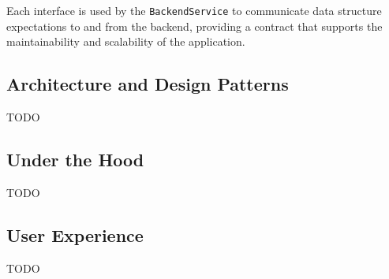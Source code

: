 Each interface is used by the \texttt{BackendService} to communicate data structure expectations to and from the backend, providing a contract that supports the maintainability and scalability of the application.

\subsection{Architecture and Design Patterns}\label{subsec:architecture-and-design-patterns}
TODO
\subsection{Under the Hood}\label{subsec:under-the-hood}
TODO
\subsection{User Experience}\label{subsec:user-experience}
TODO